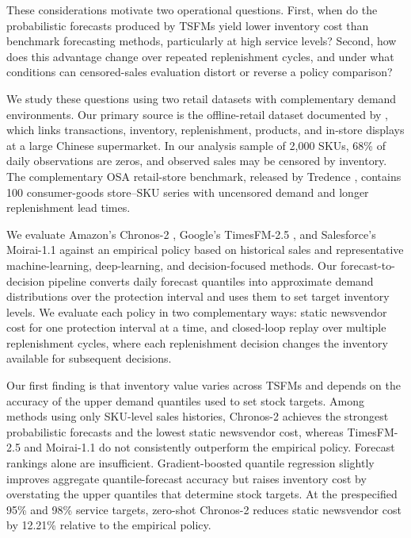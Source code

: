 \documentclass[msom,dblanonrev]{informs4}
\begin{document}
These considerations motivate two operational questions. First, when do the probabilistic forecasts produced by TSFMs yield lower inventory cost than benchmark forecasting methods, particularly at high service levels? Second, how does this advantage change over repeated replenishment cycles, and under what conditions can censored-sales evaluation distort or reverse a policy comparison?

We study these questions using two retail datasets with complementary demand environments. Our primary source is the offline-retail dataset documented by \citet{ZhaoEtAl2020}, which links transactions, inventory, replenishment, products, and in-store displays at a large Chinese supermarket.  In our analysis sample of 2{,}000 SKUs, 68\% of daily observations are zeros, and observed sales may be censored by inventory. The complementary OSA retail-store benchmark, released by Tredence \citep{TredenceOSAData2021}, contains 100 consumer-goods store--SKU series with uncensored demand and longer replenishment lead times.

We evaluate Amazon’s Chronos-2 \citep{Ansari2025Chronos2}, Google’s TimesFM-2.5 \citep{TimesFM2024}, and Salesforce’s Moirai-1.1 \citep{Moirai2024} against an empirical policy based on historical sales and representative machine-learning, deep-learning, and decision-focused methods.
Our forecast-to-decision pipeline converts daily forecast quantiles into approximate demand distributions over the protection interval and uses them to set target inventory levels. We evaluate each policy in two complementary ways: static newsvendor cost for one protection interval at a time, and closed-loop replay over multiple replenishment cycles, where each replenishment decision changes the inventory available for subsequent decisions.


Our first finding is that inventory value varies across TSFMs and depends on the accuracy of the upper demand quantiles used to set stock targets. Among methods using only SKU-level sales histories, Chronos-2 achieves the strongest probabilistic forecasts and the lowest static newsvendor cost, whereas TimesFM-2.5 and Moirai-1.1 do not consistently outperform the empirical policy. Forecast rankings alone are insufficient. Gradient-boosted quantile regression slightly improves aggregate quantile-forecast accuracy but raises inventory cost by overstating the upper quantiles that determine stock targets. At the prespecified 95\% and 98\% service targets, zero-shot Chronos-2 reduces static newsvendor cost by 12.21\% relative to the empirical policy.
\end{document}
